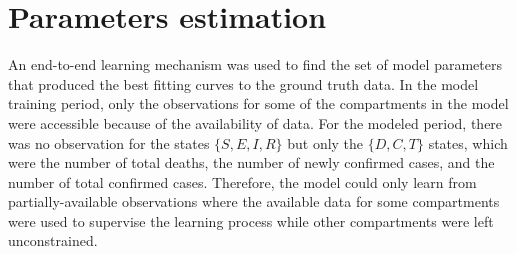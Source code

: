 \section{Parameters estimation}
\label{sec:methodologies-parameters-estimation}

An end-to-end learning mechanism was used to find the set of model parameters that produced the best fitting curves to the ground truth data.
In the model training period, only the observations for some of the compartments in the model were accessible because of the availability of data.
For the modeled period, there was no observation for the states $\{S, E, I, R\}$ but only the $\{D, C, T\}$ states, which were the number of total deaths, the number of newly confirmed cases, and the number of total confirmed cases.
Therefore, the model could only learn from partially-available observations where the available data for some compartments were used to supervise the learning process while other compartments were left unconstrained.

